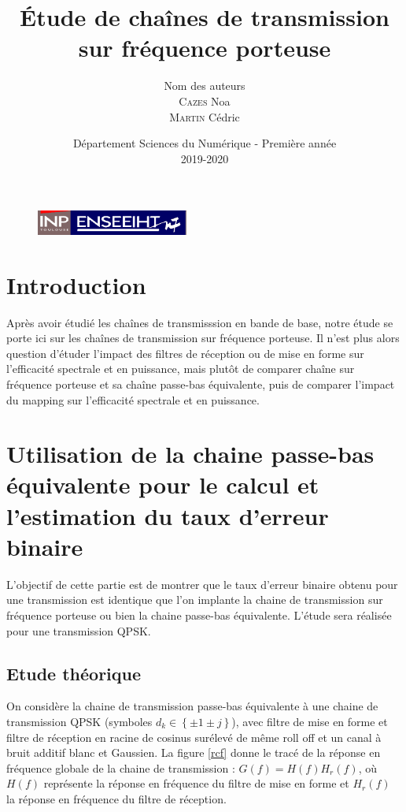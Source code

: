 \documentclass{article}
\begin{document}
\begin{figure}[t]
\centering
\includegraphics[width=5cm]{inp_n7.png}
\end{figure}

\title{\vspace{4cm} \textbf{Étude de chaînes de transmission sur fréquence porteuse}}
\author{Nom des auteurs\\ \textsc{Cazes} Noa\\ \textsc{Martin} Cédric}
\date{\vspace{11cm} Département Sciences du Numérique - Première année \\
2019-2020 }

\maketitle

\newpage
\tableofcontents
\listoffigures

\newpage


\section{Introduction}

\setlength\parindent{0.5cm}
Après avoir étudié les chaînes de transmisssion en bande de base, notre étude se porte ici sur les chaînes de transmission sur fréquence porteuse. Il n'est plus alors question d'étuder l'impact des filtres de réception ou de mise en forme sur l'efficacité spectrale et en puissance, mais plutôt de comparer chaîne sur fréquence porteuse et sa chaîne passe-bas équivalente, puis de comparer l'impact du mapping sur l'efficacité spectrale et en puissance.  


\section{Utilisation de la chaine passe-bas équivalente pour le calcul et l'estimation du taux d'erreur binaire}

L'objectif de cette partie est de montrer que le taux d'erreur binaire obtenu pour une transmission est identique que l'on implante la chaine de transmission sur fréquence porteuse ou bien la chaine passe-bas équivalente. L'étude sera réalisée pour une transmission QPSK.

\subsection{Etude théorique}
On considère la chaine de transmission passe-bas équivalente à une chaine de transmission QPSK (symboles $d_k \in \left\{\pm 1 \pm j\right\}$), avec filtre de mise en forme et filtre de réception en racine de cosinus surélevé de même roll off et un canal à bruit additif blanc et Gaussien. La figure \ref{rcf} donne le tracé de la réponse en fréquence globale de la chaine de transmission : $G(f)=H(f)H_r(f)$, où $H(f)$ représente la réponse en fréquence du filtre de mise en forme et $H_r(f)$ la réponse en fréquence du filtre de réception.
\end{document}
